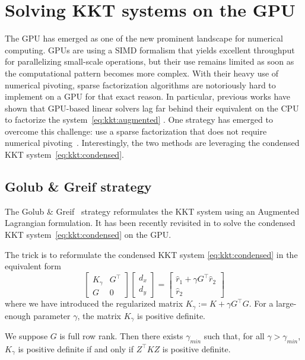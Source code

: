 \section{Solving KKT systems on the GPU}
The GPU has emerged as one of the new prominent landscape
for numerical computing. GPUs are using a SIMD formalism
that yields excellent throughput for parallelizing small-scale
operations, but their use remains limited as soon as the computational
pattern becomes more complex. With their heavy use of numerical
pivoting, sparse factorization algorithms are notoriously hard to implement
on a GPU for that exact reason. In particular, previous works have
shown that GPU-based linear solvers lag far behind their equivalent
on the CPU to factorize the system~\eqref{eq:kkt:augmented}
\cite{tasseff2019exploring,swirydowicz2021linear}. One strategy
has emerged to overcome this challenge:
use a sparse factorization that does not require numerical pivoting~\cite{regev2023hykkt,shin2023accelerating}.
Interestingly, the two methods are leveraging the condensed KKT system~\eqref{eq:kkt:condensed}.

\subsection{Golub \& Greif strategy}
\label{sec:kkt:golubgreif}
The Golub \& Greif~\cite{golub2003solving} strategy reformulates the KKT system
using an Augmented Lagrangian formulation.
It has been recently revisited in \cite{regev2023hykkt}
to solve the condensed KKT system~\eqref{eq:kkt:condensed} on the GPU.

The trick is to reformulate the condensed KKT system \eqref{eq:kkt:condensed} in the equivalent form
\begin{equation}
  \label{eq:kkt:hykkt}
  \begin{bmatrix}
    K_\gamma & G^\top \\
    G & 0
  \end{bmatrix}
  \begin{bmatrix}
    d_x \\ d_y
  \end{bmatrix}
  =
  \begin{bmatrix}
    \hat{r}_1 + \gamma G^\top \hat{r}_2 \\
    \hat{r}_2
  \end{bmatrix}
\end{equation}
where we have introduced the regularized matrix $K_\gamma := K + \gamma G^\top G$.
For a large-enough parameter $\gamma$, the matrix $K_\gamma$ is positive definite.
\begin{proposition}
  We suppose $G$ is full row rank. Then there exists $\gamma_{min}$
  such that, for all $\gamma > \gamma_{min}$, $K_\gamma$ is positive definite
  if and only if $Z^\top K Z$ is positive definite.
\end{proposition}

